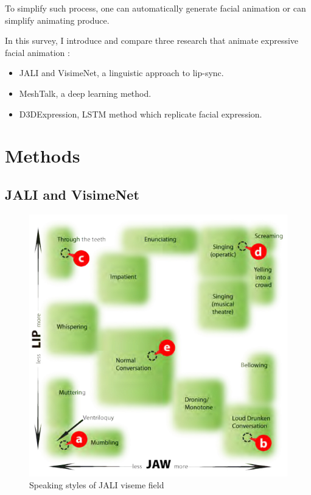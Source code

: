 \documentclass[10pt,twocolumn,letterpaper]{article}
\begin{document}
To simplify such process, one can automatically generate facial animation or can simplify animating produce.

In this survey, I introduce and compare three research that animate expressive facial animation :
\begin{itemize}
 \item JALI\cite{edwardsJALIAnimatorcentricViseme2016} and VisimeNet\cite{zhouVisemenetAudiodrivenAnimatorcentric2018}, a linguistic approach to lip-sync.
 \item MeshTalk\cite{richardMeshTalk3DFace2021}, a deep learning method.
 \item D3DExpression\cite{potamiasLearningGenerateCustomized2020}, LSTM method which replicate facial expression.
\end{itemize}






\section{Methods}

\subsection{JALI and VisimeNet}

\begin{figure}
   \includegraphics{jaliStyles}
   
   \caption{Speaking styles of JALI viseme field}
   \label{fig:jaliStyles}
\end{figure}
\end{document}
